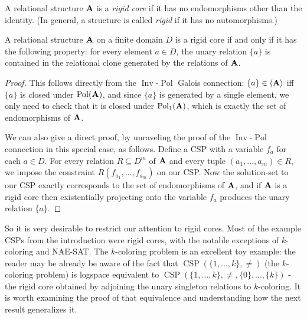 \documentclass[letterpaper,11pt]{article}
\DeclareMathOperator{\Pol}{Pol}
\DeclareMathOperator{\Inv}{Inv}
\DeclareMathOperator{\CSP}{CSP}
\begin{document}
\begin{defn} A relational structure $\mathbf{A}$ is a \emph{rigid core} if it has no endomorphisms other than the identity. (In general, a structure is called \emph{rigid} if it has no automorphisms.)
\end{defn}

\begin{thm} A relational structure $\mathbf{A}$ on a finite domain $D$ is a rigid core if and only if it has the following property: for every element $a \in D$, the unary relation $\{a\}$ is contained in the relational clone generated by the relations of $\mathbf{A}$.
\end{thm}
\begin{proof} This follows directly from the $\Inv$-$\Pol$ Galois connection: $\{a\} \in \langle \mathbf{A} \rangle$ iff $\{a\}$ is closed under $\Pol(\fA)$, and since $\{a\}$ is generated by a single element, we only need to check that it is closed under $\Pol_1(\fA)$, which is exactly the set of endomorphisms of $\mathbf{A}$.

We can also give a direct proof, by unraveling the proof of the $\Inv$-$\Pol$ connection in this special case, as follows. Define a CSP with a variable $f_a$ for each $a \in D$. For every relation $R \subseteq D^m$ of $\mathbf{A}$ and every tuple $(a_1, ..., a_m) \in R$, we impose the constraint $R(f_{a_1}, ..., f_{a_m})$ on our CSP. Now the solution-set to our CSP exactly corresponds to the set of endomorphisms of $\mathbf{A}$, and if $\mathbf{A}$ is a rigid core then existentially projecting onto the variable $f_a$ produces the unary relation $\{a\}$.
\end{proof}

So it is very desirable to restrict our attention to rigid cores. Most of the example CSPs from the introduction were rigid cores, with the notable exceptions of $k$-coloring and NAE-SAT. The $k$-coloring problem is an excellent toy example: the reader may be already be aware of the fact that $\CSP(\{1, ..., k\}, \ne)$ (the $k$-coloring problem) is logspace equivalent to $\CSP(\{1,...,k\}, \ne, \{0\}, ..., \{k\})$ - the rigid core obtained by adjoining the unary singleton relations to $k$-coloring. It is worth examining the proof of that equivalence and understanding how the next result generalizes it.
\end{document}
